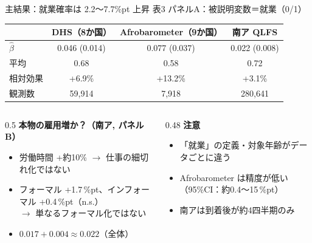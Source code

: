 \documentclass[aspectratio=169,11pt]{beamer}
\newcommand{\pp}{\,\%pt}
\begin{document}
\begin{frame}{主結果：就業確率は 2.2〜7.7\%pt 上昇}
  \small 表3 パネルA：被説明変数＝就業（0/1）\\[0.3em]
  \centering
  \begin{tabular}{lccc}
    \toprule
    & DHS（8か国） & Afrobarometer（9か国） & 南ア QLFS \\
    \midrule
    $\hat\beta$ & 0.046 (0.014) & 0.077 (0.037) & 0.022 (0.008) \\
    平均 & 0.68 & 0.58 & 0.72 \\
    相対効果 & +6.9\% & +13.2\% & +3.1\% \\
    観測数 & 59,914 & 7,918 & 280,641 \\
    \bottomrule
  \end{tabular}
  \raggedright
  \vspace{0.6em}
  \begin{columns}[T]
    \begin{column}{0.5\textwidth}
      \textbf{本物の雇用増か？（南ア, パネルB）}
      \begin{itemize}\small
        \item 労働時間 +約10\% $\to$ 仕事の細切れ化ではない
        \item フォーマル +1.7\pp、インフォーマル +0.4\pp（n.s.）\\$\to$ 単なるフォーマル化ではない
        \item $0.017 + 0.004 \approx 0.022$（全体）
      \end{itemize}
    \end{column}
    \begin{column}{0.48\textwidth}
      \textbf{注意}
      \begin{itemize}\small
        \item 「就業」の定義・対象年齢がデータごとに違う
        \item Afrobarometer は精度が低い（95\%CI：約0.4〜15\pp）
        \item 南アは到着後が約4四半期のみ
      \end{itemize}
    \end{column}
  \end{columns}
\end{frame}
\end{document}
